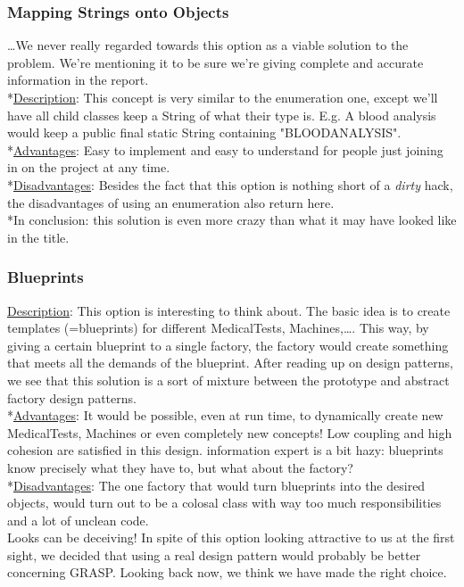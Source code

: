 \documentclass[11pt]{article}
\begin{document}
\subsubsection{Mapping Strings onto Objects}
\dots We never really regarded towards this option as a viable solution to the problem. We're mentioning it to be sure we're giving complete and accurate information in the report.
\\*\underline{Description}: This concept is very similar to the enumeration one, except we'll have all child classes keep a String of what their type is. E.g. A blood analysis would keep a public final static String containing "BLOODANALYSIS".
\\*\underline{Advantages}: Easy to implement and easy to understand for people just joining in on the project at any time.
\\*\underline{Disadvantages}: Besides the fact that this option is nothing short of a \emph{dirty} hack, the disadvantages of using an enumeration also return here.
\\*In conclusion: this solution is even more crazy than what it may have looked like in the title.

\subsubsection{Blueprints}
\underline{Description}: This option is interesting to think about. The basic idea is to create templates (=blueprints) for different MedicalTests, Machines,\dots. This way, by giving a certain blueprint to a single factory, the factory would create something that meets all the demands of the blueprint. After reading up on design patterns, we see that this solution is a sort of mixture between the prototype and abstract factory design patterns.
\\*\underline{Advantages}: It would be possible, even at run time, to dynamically create new MedicalTests, Machines or even completely new concepts! Low coupling and high cohesion are satisfied in this design. information expert is a bit hazy: blueprints know precisely what they have to, but what about the factory?
\\*\underline{Disadvantages}: The one factory that would turn blueprints into the desired objects, would turn out to be a colosal class with way too much responsibilities and a lot of unclean code.
\\Looks can be deceiving! In spite of this option looking attractive to us at the first sight, we decided that using a real design pattern would probably be better concerning GRASP. Looking back now, we think we have made the right choice.
\end{document}
